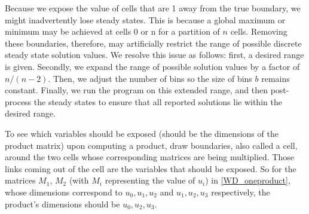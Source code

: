 \documentclass[11pt]{article}
\begin{document}
Because we expose the value of cells that are 1 away from the true boundary, we might inadvertently lose steady states. This is because a global maximum or minimum may be achieved at cells 0 or n for a partition of $n$ cells. Removing these boundaries, therefore, may artificially restrict the range of possible discrete steady state solution values. We resolve this issue as follows: first, a desired range is given. Secondly, we expand the range of possible solution values by a factor of $n/(n-2)$. Then, we adjust the number of bins so the size of bins $b$ remains constant. Finally, we run the program on this extended range, and then post-process the steady states to ensure that all reported solutions lie within the desired range.

To see which variables should be exposed (should be the dimensions of the product matrix) upon computing a product, draw boundaries, also called a cell, around the two cells whose corresponding matrices are being multiplied. Those links coming out of the cell are the variables that should be exposed. So for the matrices $M_1$, $M_2$ (with $M_i$ representing the value of $u_i$) in \cref{WD_oneproduct}, whose dimensions correspond to $u_0, u_1, u_2$ and $u_1, u_2, u_3$ respectively, the product's dimensions should be $u_0, u_2, u_3$.


\begin{figure*}
\caption{Wiring diagram for a single product with 3 exposed variables and 4 total variables}
\label{WD_oneproduct}
\begin{center}
\end{center}
\end{figure*}
\end{document}
